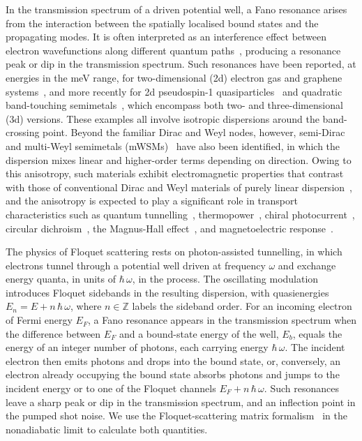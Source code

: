 \documentclass[aps,prb,onecolumn,longbibliography,nofootinbib,citeautoscript,10pt]{revtex4-2}
\begin{document}
In the transmission spectrum of a driven potential well, a Fano resonance arises from the interaction between the spatially localised bound states and the propagating modes. It is often interpreted as an interference effect between electron wavefunctions along different quantum paths~\cite{Zhu15},  producing a resonance peak or dip in the transmission spectrum. Such resonances have been reported, at energies in the meV range, for two-dimensional (2d) electron gas and graphene systems~\cite{Zhu15, reichl199, Dai2014},  and more recently for 2d pseudospin-1 quasiparticles~\cite{Zhu17} and quadratic band-touching semimetals~\cite{bera2021},  which encompass both two- and three-dimensional (3d) versions. These examples all involve isotropic dispersions around the band-crossing point. Beyond the familiar Dirac and Weyl nodes, however, semi-Dirac~\cite{pickett09, ips-kush, ips-kush-review, ips-abs-semidirac} and multi-Weyl semimetals (mWSMs)~\cite{pickett09, liu2017predicted, Gang2011} have also been identified, in which the dispersion mixes linear and higher-order terms depending on direction. Owing to this anisotropy, such materials exhibit electromagnetic properties that contrast with those of conventional Dirac and Weyl materials of purely linear dispersion~\cite{jose2011,dietl08}, and the anisotropy is expected to play a significant role in transport characteristics such as quantum tunnelling~\cite{Khokhlov2018, Deng2020, ips-aritra},  thermopower~\cite{ips-kush, ips-kush-review},  chiral photocurrent~\cite{ips-photocurrent}, circular dichroism~\cite{sajid-cd, ips_cd}, the Magnus-Hall effect~\cite{sajid_magnus22}, and magnetoelectric response~\cite{ipsita-shivam, rahul-jpcm, ips-ruiz, ips-tilted, ips-cjp}.

The physics of Floquet scattering rests on photon-assisted tunnelling, in which electrons tunnel through a potential well driven at frequency $\omega$ and exchange energy quanta, in units of $\hbar \, \omega$, in the process. The oscillating modulation introduces Floquet sidebands in the resulting dispersion, with quasienergies $E_n = E + n \, \hbar \, \omega$, where $n \in \mathbb{Z}$ labels the sideband order. For an incoming electron of Fermi energy $E_F$, a Fano resonance appears in the transmission spectrum when the difference between $E_F$ and a bound-state energy of the well, $E_b$, equals the energy of an integer number of photons, each carrying energy $\hbar \, \omega$. The incident electron then emits photons and drops into the bound state, or, conversely, an electron already occupying the bound state absorbs photons and jumps to the incident energy or to one of the Floquet channels $E_F + n \, \hbar \, \omega$. Such resonances leave a sharp peak or dip in the transmission spectrum, and an inflection point in the pumped shot noise. We use the Floquet-scattering matrix formalism~\cite{Zhu15, reichl199, Dai2014,Zhu17, Araujo2021} in the nonadiabatic limit to calculate both quantities.
\end{document}
